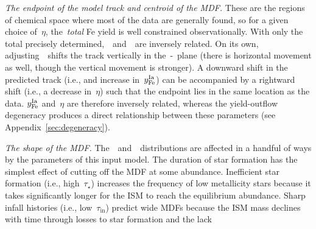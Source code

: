\documentclass[foo.tex]{subfiles}
\begin{document}
\textit{The endpoint of the model track and centroid of the MDF.}
These are the regions of chemical space where most of the
data are generally found, so for a given choice of~$\eta$, the~\textit{total}
Fe yield is well constrained observationally.
With only the total precisely determined,~\yfecc~and~\yfeia~are inversely
related.
On its own, adjusting~\yfeia~shifts the track vertically in the~\afe-\feh~plane
(there is horizontal movement as well, though the vertical movement is
stronger).
A downward shift in the predicted track (i.e., and increase in~$y_\text{Fe}^\text{Ia}$) can be
accompanied by a rightward shift (i.e., a decrease in~$\eta$) such that the
endpoint lies in the same location as the data.
$y_\text{Fe}^\text{Ia}$ and~$\eta$ are therefore inversely related, whereas the yield-outflow
degeneracy produces a direct relationship between these parameters
(see Appendix~\ref{sec:degeneracy}).
\par
\textit{The shape of the MDF.}
The~\afe~and~\feh~distributions are affected in a handful of ways by the
parameters of this input model.
The duration of star formation has the simplest effect of cutting off the MDF
at some abundance.
Inefficient star formation (i.e., high~$\tau_\star$) increases the frequency of
low metallicity stars because it takes significantly longer for the ISM to
reach the equilibrium abundance.
Sharp infall histories (i.e., low~$\tau_\text{in}$) predict wide MDFs because
the ISM mass declines with time through losses to star formation and the lack
\end{document}
